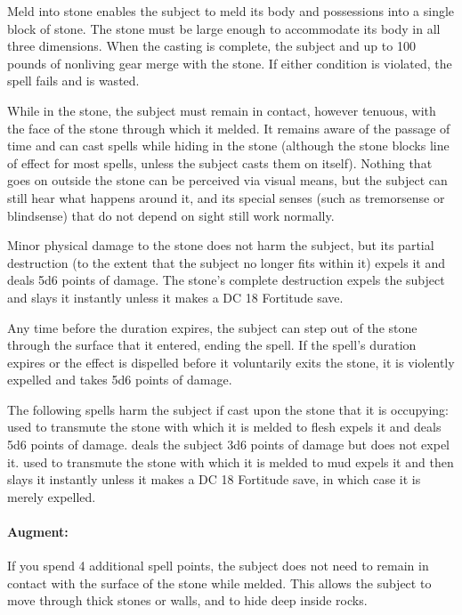 Meld into stone enables the subject to meld its body and possessions into a single block of stone. 
The stone must be large enough to accommodate its body in all three dimensions. 
When the casting is complete, the subject and up to 100 pounds of nonliving gear merge with the stone. 
If either condition is violated, the spell fails and is wasted.

While in the stone, the subject must remain in contact, however tenuous, with the face of the stone through which it melded. 
It remains aware of the passage of time and can cast spells while hiding in the stone (although the stone blocks line of effect for most spells, unless the subject casts them on itself). 
Nothing that goes on outside the stone can be perceived via visual means, but the subject can still hear what happens around it, and its special senses (such as tremorsense or blindsense) that do not depend on sight still work normally.

Minor physical damage to the stone does not harm the subject, but its partial destruction (to the extent that the subject no longer fits within it) expels it and deals 5d6 points of damage. 
The stone's complete destruction expels the subject and slays it instantly unless it makes a DC 18 Fortitude save.

Any time before the duration expires, the subject can step out of the stone through the surface that it entered, ending the spell. 
If the spell's duration expires or the effect is dispelled before it voluntarily exits the stone, it is violently expelled and takes 5d6 points of damage.

The following spells harm the subject if cast upon the stone that it is occupying:  used to transmute the stone with which it is melded to flesh expels it and deals 5d6 points of damage. 
 deals the subject 3d6 points of damage but does not expel it.  used to transmute the stone with which it is melded to mud expels it and then slays it instantly unless it makes a DC 18 Fortitude save, in which case it is merely expelled.

\paragraph{Augment:} If you spend 4 additional spell points, the subject does not need to remain in contact with the surface of the stone while melded. This allows the subject to move through thick stones or walls, and to hide deep inside rocks.

